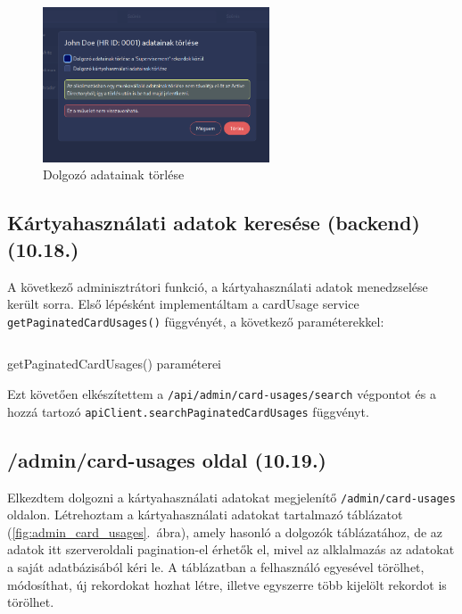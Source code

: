 \documentclass[a4paper]{article}
\newcommand{\inltxt}[1]{\texttt{#1}}
\begin{document}
\begin{figure}[ht]
  \centering
  \includegraphics[width = 0.6\textwidth]{images/delete_employee.png}
  \caption{Dolgozó adatainak törlése}
  \label{fig:delete_employee}
\end{figure}

\subsection{Kártyahasználati adatok keresése (backend) (10.18.)}

A következő adminisztrátori funkció, a kártyahasználati adatok menedzselése került sorra. Első
lépésként implementáltam a cardUsage service \inltxt{getPaginatedCardUsages()} függvényét, a
következő paraméterekkel:

\begin{listing}[!ht]
\inputminted[bgcolor=codebg, breaklines, breakanywhere, fontsize=\small]{typescript}{code/cardUsageSearchParams.ts}
\caption{getPaginatedCardUsages() paraméterei}
\label{listing:11}
\end{listing}

Ezt követően elkészítettem a \inltxt{/api/admin/card-usages/search} végpontot és a hozzá tartozó
\inltxt{apiClient.searchPaginatedCardUsages} függvényt.

\subsection{/admin/card-usages oldal (10.19.)}

Elkezdtem dolgozni a kártyahasználati adatokat megjelenítő \inltxt{/admin/card-usages} oldalon.
Létrehoztam a kártyahasználati adatokat tartalmazó táblázatot (\ref{fig:admin_card_usages}.~ábra), amely hasonló a dolgozók
táblázatához, de az adatok itt szerveroldali pagination-el érhetők el, mivel az alklalmazás az adatokat
a saját adatbázisából kéri le. A táblázatban a felhasználó egyesével törölhet, módosíthat, új rekordokat
hozhat létre, illetve egyszerre több kijelölt rekordot is törölhet.
\end{document}
